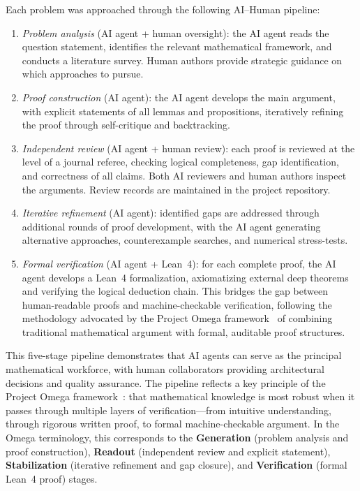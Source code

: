 \documentclass[11pt]{article}
\theoremstyle{definition}
\theoremstyle{remark}
\begin{document}
Each problem was approached through the following AI--Human pipeline:
\begin{enumerate}[nosep]
\item \emph{Problem analysis} (AI agent + human oversight):
  the AI agent reads the question statement, identifies the relevant
  mathematical framework, and conducts a literature survey.
  Human authors provide strategic guidance on which approaches to pursue.
\item \emph{Proof construction} (AI agent):
  the AI agent develops the main argument, with explicit statements of
  all lemmas and propositions, iteratively refining the proof through
  self-critique and backtracking.
\item \emph{Independent review} (AI agent + human review):
  each proof is reviewed at the level of a journal referee, checking
  logical completeness, gap identification, and correctness of all claims.
  Both AI reviewers and human authors inspect the arguments.
  Review records are maintained in the project repository.
\item \emph{Iterative refinement} (AI agent):
  identified gaps are addressed through additional rounds of proof
  development, with the AI agent generating alternative approaches,
  counterexample searches, and numerical stress-tests.
\item \emph{Formal verification} (AI agent + Lean~4):
  for each complete proof, the AI agent develops a Lean~4
  formalization, axiomatizing external deep theorems
  and verifying the logical deduction chain.  This bridges the gap
  between human-readable proofs and machine-checkable verification,
  following the methodology advocated by the Project Omega
  framework~\cite{omega-theory} of combining traditional mathematical
  argument with formal, auditable proof structures.
\end{enumerate}

This five-stage pipeline demonstrates that AI agents can serve as the
principal mathematical workforce, with human collaborators providing
architectural decisions and quality assurance.
The pipeline reflects a key principle of the Project Omega
framework~\cite{omega-fop}: that mathematical knowledge is most robust
when it passes through multiple layers of verification---from intuitive
understanding, through rigorous written proof, to formal machine-checkable
argument.  In the Omega terminology, this corresponds to the
\textbf{Generation} (problem analysis and proof construction),
\textbf{Readout} (independent review and explicit statement),
\textbf{Stabilization} (iterative refinement and gap closure), and
\textbf{Verification} (formal Lean~4 proof) stages.
\end{document}

